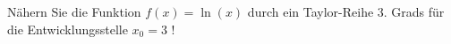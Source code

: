 \item
Nähern Sie die Funktion $f(x) = \ln(x)$ durch ein Taylor-Reihe 3. Grads für die Entwicklungsstelle $x_0=3$ !
